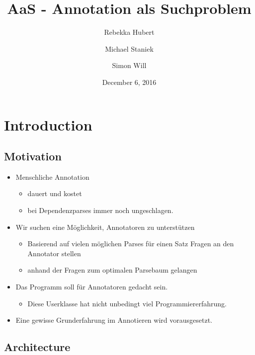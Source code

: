 \documentclass{scrartcl}
\title{AaS - Annotation als Suchproblem}
\author{Rebekka Hubert \and Michael Staniek \and Simon Will}
\date{December 6, 2016}
\begin{document}
\maketitle

\section{Introduction}
\label{sec:Introduction}

\subsection{Motivation}
\label{sub:Motivation}
\begin{itemize}
        \item Menschliche Annotation
            \begin{itemize}
                \item dauert und kostet
                \item bei Dependenzparses immer noch ungeschlagen. %
            \end{itemize}
        \item Wir suchen eine Möglichkeit, Annotatoren zu unterstützen
            \begin{itemize}
                \item Basierend auf vielen möglichen Parses für einen Satz Fragen an den Annotator stellen
                \item anhand der Fragen zum optimalen Parsebaum gelangen
            \end{itemize}
    \end{itemize}

    \begin{itemize}
        \item Das Programm soll für Annotatoren gedacht sein.
            \begin{itemize}
                \item Diese Userklasse hat nicht unbedingt viel Programmiererfahrung.
            \end{itemize}
        \item Eine gewisse Grunderfahrung im Annotieren wird vorausgesetzt.
    \end{itemize}

\subsection{Architecture}
\label{sub:Architecture}
\end{document}
